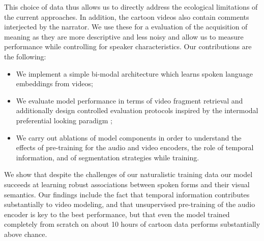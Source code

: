 This choice of data thus allows us to directly address the ecological limitations 
of the current approaches. In addition, the cartoon videos also contain 
comments interjected by the narrator. We use these for a evaluation of the 
acquisition of meaning as they are more descriptive and less noisy and allow 
us to measure performance while controlling for speaker characteristics.
Our contributions are the following:
\begin{itemize}
\item We implement a simple bi-modal architecture which learns
  spoken language embeddings from videos;
\item We evaluate model performance in terms of video fragment
  retrieval and additionally design controlled evaluation
  protocols inspired by the intermodal preferential looking
  paradigm \citep{hirsh1996intermodal};
\item We carry out ablations of model components in order to
  understand the effects of pre-training for the audio and video
  encoders, the role of temporal information, and of segmentation
  strategies while training. 
\end{itemize}
We show that despite the challenges of our naturalistic training data
our model succeeds at learning robust associations between spoken 
forms and their visual semantics.
Our findings include the fact that temporal information
contributes substantially to video modeling, and that unsupervised
pre-training of the audio encoder is key to the best performance, but that
even the model trained completely from scratch on about 10 hours of
cartoon data performs substantially above chance.




